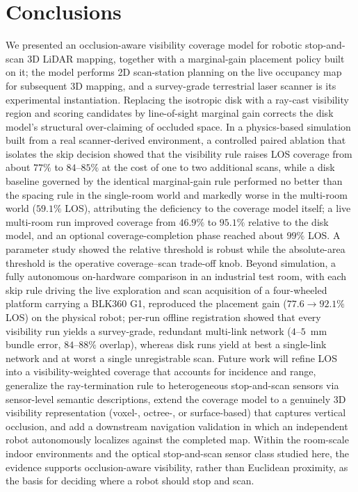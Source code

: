 \documentclass[sensors,article,submit,pdftex,moreauthors]{Definitions/mdpi}
\begin{document}
\section{Conclusions}
\label{sec:conclusions}

We presented an occlusion-aware visibility coverage model for robotic
stop-and-scan 3D LiDAR mapping, together with a marginal-gain placement policy
built on it; the model performs 2D scan-station planning on the live occupancy
map for subsequent 3D mapping, and a survey-grade terrestrial laser scanner is
its experimental instantiation. Replacing the isotropic disk with a ray-cast
visibility region and scoring candidates by line-of-sight marginal gain
corrects the disk model's structural over-claiming of occluded space. In a physics-based simulation built
from a real scanner-derived environment, a controlled paired ablation that
isolates the skip decision showed that the visibility rule raises LOS coverage
from about $77\%$ to $84$--$85\%$ at the cost of one to two additional scans,
while a disk baseline governed by the identical marginal-gain rule performed no
better than the spacing rule in the single-room world and markedly worse in the
multi-room world ($59.1\%$ LOS), attributing the deficiency to the coverage
model itself; a live multi-room run improved coverage from $46.9\%$ to
$95.1\%$ relative to the disk model, and an optional coverage-completion phase
reached about $99\%$ LOS. A
parameter study showed the relative threshold is robust while the absolute-area
threshold is the operative coverage--scan trade-off knob. Beyond simulation, a fully
autonomous on-hardware comparison in an industrial test room, with each skip
rule driving the live exploration and scan acquisition of a four-wheeled
platform carrying a BLK360 G1, reproduced the placement gain
($77.6\to92.1\%$ LOS) on the physical robot; per-run offline registration showed
that every visibility run yields a survey-grade, redundant multi-link network
($4$--$5$~mm bundle error, $84$--$88\%$ overlap), whereas disk runs yield at
best a single-link network and at worst a single unregistrable scan. Future work will
refine LOS into a visibility-weighted coverage that accounts for incidence and
range, generalize the ray-termination rule to heterogeneous stop-and-scan sensors
via sensor-level semantic descriptions, extend the coverage model to a
genuinely 3D visibility representation (voxel-, octree-, or surface-based)
that captures vertical occlusion, and add a downstream navigation validation
in which an independent robot autonomously localizes against the completed
map. Within the room-scale indoor environments and the optical stop-and-scan
sensor class studied here, the evidence supports occlusion-aware visibility,
rather than Euclidean proximity, as the basis for deciding where a robot
should stop and scan.
\end{document}
